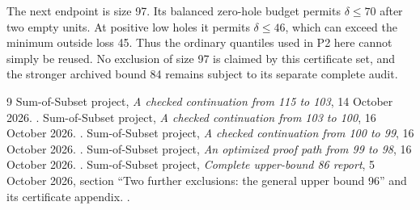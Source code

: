 \documentclass[11pt,a4paper]{article}
\begin{document}
The next endpoint is size 97. Its balanced zero-hole budget permits
$\delta\le70$ after two empty units. At positive low holes it permits
$\delta\le46$, which can exceed the minimum outside loss 45.
Thus the ordinary quantiles used in P2 here cannot simply be reused.
No exclusion of size 97 is claimed by this certificate set, and the
stronger archived bound 84 remains subject to its separate complete audit.

\begin{thebibliography}{9}
 Sum-of-Subset project,
\emph{A checked continuation from 115 to 103}, 14 October 2026.
.
 Sum-of-Subset project,
\emph{A checked continuation from 103 to 100}, 16 October 2026.
.
 Sum-of-Subset project,
\emph{A checked continuation from 100 to 99}, 16 October 2026.
.
 Sum-of-Subset project,
\emph{An optimized proof path from 99 to 98}, 16 October 2026.
.
 Sum-of-Subset project,
\emph{Complete upper-bound 86 report}, 5 October 2026,
section ``Two further exclusions: the general upper bound 96'' and its
certificate appendix. .
\end{thebibliography}
\end{document}
